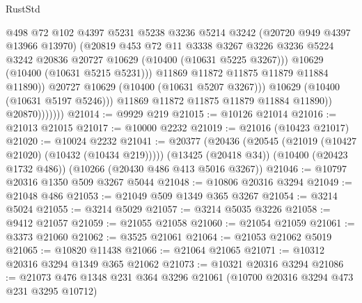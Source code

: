 \begin{lexlean}{RustStd}
\begin{coremodule}
{\begin{coremodule}
{{{{{{{{{{{{{{{{{{{{{{{{{                                @498
                                @72
                                @102
                                @4397
                                @5231
                                @5238
                                @3236
                                @5214
                                @3242
                                (@20720 @949 @4397 @13966 @13970)
                                (@20819
                                  @453
                                  @72
                                  @11
                                  @3338
                                  @3267
                                  @3226
                                  @3236
                                  @5224
                                  @3242
                                  @20836
                                  @20727
                                  @10629
                                  (@10400 (@10631 @5225 @3267)))
                                @10629
                                (@10400 (@10631 @5215 @5231)))
                              @11869
                              @11872
                              @11875
                              @11879
                              @11884
                              @11890))
                          @20727
                          @10629
                          (@10400 (@10631 @5207 @3267)))
                        @10629
                        (@10400 (@10631 @5197 @5246)))
                      @11869
                      @11872
                      @11875
                      @11879
                      @11884
                      @11890))
                  @20870)))))))
@21014 := @9929 @219
@21015 := @10126 @21014
@21016 := @21013 @21015
@21017 := @10000 @2232
@21019 := @21016 (@10423 @21017)
@21020 := @10024 @2232
@21041 := @20377
    (@20436 (@20545 (@21019 (@10427 @21020) (@10432 (@10434 @219)))))
    (@13425 (@20418 @34))
    (@10400 (@20423 @1732 @486))
    (@10266 (@20430 @486 @413 @5016 @3267))
@21046 := @10797 @20316 @1350 @509 @3267 @5044
@21048 := @10806 @20316 @3294
@21049 := @21048 @486
@21053 := @21049 @509 @1349 @365 @3267
@21054 := @3214 @5024
@21055 := @3214 @5029
@21057 := @3214 @5035 @3226
@21058 := @9412 @21057
@21059 := @21055 @21058
@21060 := @21054 @21059
@21061 := @3373 @21060
@21062 := @3525 @21061
@21064 := @21053 @21062 @5019
@21065 := @10820 @11438
@21066 := @21064 @21065
@21071 := @10312 @20316 @3294 @1349 @365 @21062
@21073 := @10321 @20316 @3294
@21086 := @21073 @476 @1348 @231 @364 @3296 @21061 (@10700 @20316 @3294 @473 @231 @3295 @10712)
}}}}}}}}}}}}}}}}}}}}}}}}}
\end{coremodule}}
\end{coremodule}
\end{lexlean}
